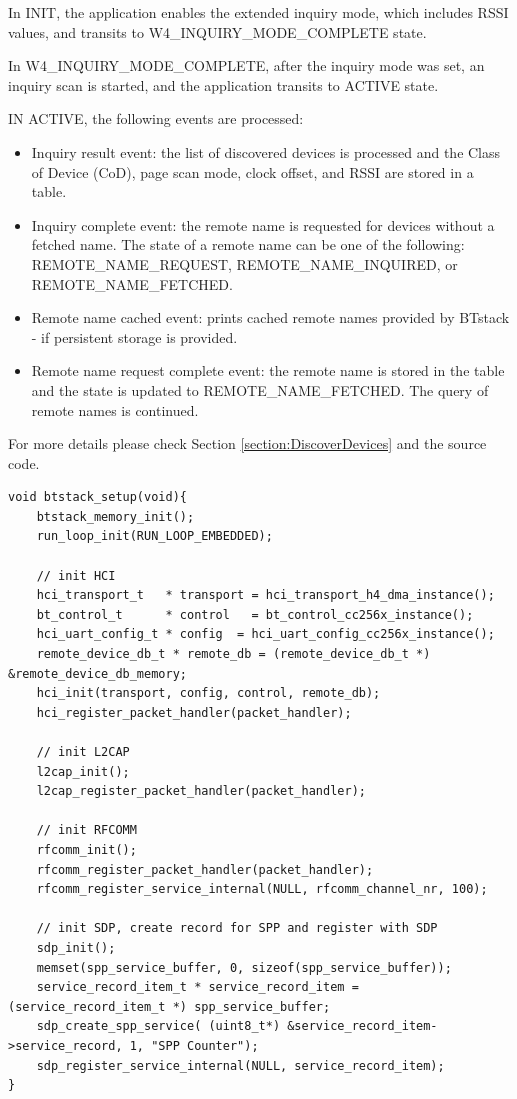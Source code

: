 \documentclass[a4paper,titlepage,oneside,12pt]{amsart} %
\begin{document}
In INIT, the application enables the extended inquiry mode, which includes RSSI values, and transits to W4\_INQUIRY\_MODE\_COMPLETE state.

In W4\_INQUIRY\_MODE\_COMPLETE, after the inquiry mode was set, an inquiry scan is started, and the application transits to ACTIVE state. 

IN ACTIVE, the following events are processed:
\begin{itemize}
\item Inquiry result event: the list of discovered devices is processed and the Class of Device (CoD), page scan mode, clock offset, and RSSI are stored in a table.
\item Inquiry complete event: the remote name is requested for devices without a fetched name. The state of a remote name can be one of the following: REMOTE\_NAME\_REQUEST, REMOTE\_NAME\_INQUIRED, or REMOTE\_NAME\_FETCHED.
\item Remote name cached event: prints cached remote names provided by BTstack - if persistent storage is provided.
\item Remote name request complete event: the remote name is stored in the table and the state is updated to REMOTE\_NAME\_FETCHED. The query of remote names is continued.
\end{itemize}

For more details please check Section \ref{section:DiscoverDevices} and the source code.


\begin{lstlisting}[caption=SPP service setup, label=SPPSetup]
void btstack_setup(void){
    btstack_memory_init();
    run_loop_init(RUN_LOOP_EMBEDDED);
    
    // init HCI
    hci_transport_t   * transport = hci_transport_h4_dma_instance();
    bt_control_t      * control   = bt_control_cc256x_instance();
    hci_uart_config_t * config  = hci_uart_config_cc256x_instance();
    remote_device_db_t * remote_db = (remote_device_db_t *) &remote_device_db_memory;
    hci_init(transport, config, control, remote_db);
    hci_register_packet_handler(packet_handler);
    
    // init L2CAP
    l2cap_init();
    l2cap_register_packet_handler(packet_handler);
    
    // init RFCOMM
    rfcomm_init();
    rfcomm_register_packet_handler(packet_handler);
    rfcomm_register_service_internal(NULL, rfcomm_channel_nr, 100); 

    // init SDP, create record for SPP and register with SDP
    sdp_init();
    memset(spp_service_buffer, 0, sizeof(spp_service_buffer));
    service_record_item_t * service_record_item = (service_record_item_t *) spp_service_buffer;
    sdp_create_spp_service( (uint8_t*) &service_record_item->service_record, 1, "SPP Counter");
    sdp_register_service_internal(NULL, service_record_item);   
}
\end{lstlisting}
\end{document}
